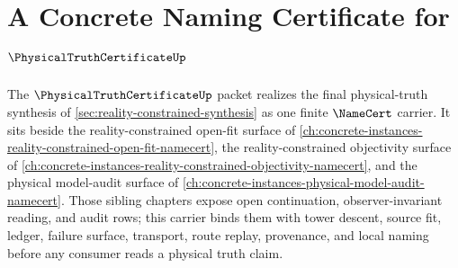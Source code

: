 \chapter{A Concrete Naming Certificate for $\PhysicalTruthCertificateUp$}
\label{ch:concrete-instances-physical-truth-certificate-namecert}

The $\PhysicalTruthCertificateUp$ packet realizes the final physical-truth synthesis of \autoref{sec:reality-constrained-synthesis} as one finite $\NameCert$ carrier. It sits beside the reality-constrained open-fit surface of \autoref{ch:concrete-instances-reality-constrained-open-fit-namecert}, the reality-constrained objectivity surface of \autoref{ch:concrete-instances-reality-constrained-objectivity-namecert}, and the physical model-audit surface of \autoref{ch:concrete-instances-physical-model-audit-namecert}. Those sibling chapters expose open continuation, observer-invariant reading, and audit rows; this carrier binds them with tower descent, source fit, ledger, failure surface, transport, route replay, provenance, and local naming before any consumer reads a physical truth claim.

